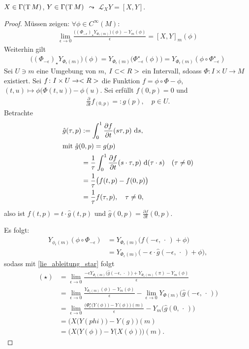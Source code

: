 \begin{proposition}
	$X\in\Gamma(\operatorname{T} M)$, $Y\in\Gamma(\operatorname{T} M)$ $\leadsto$ $\mathcal L_X Y = [X,Y]$.
\end{proposition}
\begin{proof}
	Müssen zeigen: $\forall\phi\in C^\infty(M)$: \begin{align}
		\label{lie_ableitung_star}
		\lim\limits_{\epsilon\to 0} \frac{\big( (\Phi_ {-\epsilon})_\star Y_{\Phi_\epsilon (m)}\big)(\phi) - Y_m(\phi)}{\epsilon} = [X,Y]_m(\phi)\tag{$\star$}
	\end{align}
	Weiterhin gilt \begin{align*}
		\big((\Phi_{-\epsilon})_\star Y_{\Phi_\epsilon(m)}\big)(\phi) = Y_{\Phi_\epsilon(m)}\big(\Phi_{-\epsilon}^\star(\phi)\big) = Y_{\Phi_\epsilon(m)}(\phi\circ\Phi_{-\epsilon}^\star)
	\end{align*}
	Sei $U\ni m$ eine Umgebung von $m$, $I\subset<R>$ ein Intervall, sdoass $\Phi\colon I\times U\to M$ existiert. Sei $f\colon I\times U\to <R>$ die Funktion $f=\phi\circ\Phi-\phi$, $(t,u)\mapsto \phi\big(\Phi(t,u)\big) - \phi(u)$. Sei erfüllt $f(0,p) = 0$ und \begin{align*}
		\frac\partial{\partial t} f_{(0,p)} =: g(p),\quad p\in U.
	\end{align*}
	Betrachte \begin{align*}
		\hat g(\tau,p) &:= \int_0^1 \frac{\partial f}{\partial t} (s\tau,p)\,\,\mathrm{d} s,\\
		\intertext{mit $\hat g(0,p) = g(p)$}
		&= \frac1\tau\int_0^1 \frac{\partial f}{\partial t}(s\cdot\tau,p)\,\,\mathrm{d}(\tau\cdot s)\quad(\tau\neq 0) \\
		&=\frac1\tau \big(f(t,p) - f(0,p)\big) \\
		&=\frac1\tau f(\tau,p),\quad\tau\neq 0,
	\end{align*}
	also ist $f(t,p) = t\cdot\hat g(t,p)$ und $\hat g(0,p) = \frac{\partial f}{\partial t} (0, p)$.
	
	Es folgt: \begin{align*}
		Y_{\phi_\epsilon(m)}(\phi\circ\Phi_{-\epsilon}) &= Y_{\Phi_\epsilon(m)}\big(f(-\epsilon,\,\cdot\,)+\phi\big)\\
		&=Y_{\Phi_\epsilon(m)}\big(-\epsilon\cdot\hat g(-\epsilon,\,\cdot\,)+\phi\big),
	\end{align*}
	sodass mit \eqref{lie_ableitung_star} folgt \begin{align*}
		(\star) &= \lim\limits_{\epsilon\to 0} \frac{-\epsilon Y_{\Phi_\epsilon (m)} \big(\hat g(-\epsilon,\,\cdot\,)\big) + Y_{\Phi_\epsilon (m)}(\pi) - Y_m(\phi)}{\epsilon} \\
		&= \lim\limits_{\epsilon\to 0} \frac{Y_{\Phi_\epsilon(m)}(\phi) - Y_m(\phi)}{\epsilon} - \lim\limits_{\epsilon\to 0} Y_{\Phi(m)}\big(\hat g(-\epsilon,\,\cdot\,)\big) \\
		&= \lim\limits_{\epsilon\to 0} \frac{\Big(\Phi_\epsilon^\star\big(Y(\phi)\big) - Y(\phi)\Big)(m)}{\epsilon} - Y_m\big(\hat g(0,\,\cdot\,)\big) \\
		&= \Big(X\big(Y(phi)\big) - Y(g)\Big)(m) \\
		&= \Big(X\big(Y(\phi)\big) - Y\big(X(\phi)\big)\Big)(m).
	\end{align*}
\end{proof}

